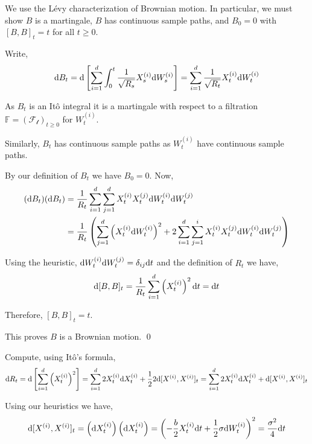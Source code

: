 \documentclass[10pt]{article}
\begin{document}
\begin{solution}[Solution]
We use the  L\'evy characterization of Brownian motion. In particular, we must show \( B \) is a martingale, \( B \) has continuous sample paths, and \( B_0 = 0 \) with \( [B,B]_t = t \) for all \( t\geq 0 \).

Write,
\begin{align*}
    \mathrm{d} B_t = \mathrm{d} \left[ \sum_{i=1}^{d} \int_{0}^{t} \dfrac{1}{\sqrt{R_s}}X_s^{(i)} \mathrm{d} W_s^{(i)} \right] = \sum_{i=1}^{d} \dfrac{1}{\sqrt{R_t}}X_t^{(i)} \mathrm{d} W_t^{(i)}
\end{align*}


As \( B_t \) is an It\^o integral it is a martingale with respect to a filtration \( \mathbb{F} = ( \mathcal{F_t} )_{t\geq 0} \) for \( W_t^{(i)} \).

Similarly, \( B_t \) has continuous sample paths as \( W_t^{(i)} \) have continuous sample paths.

By our definition of \( B_t \) we have \( B_0 = 0 \).
Now, 
\begin{align*}
    (\mathrm{d} B_t)(\mathrm{d} B_t) &= \dfrac{1}{R_t} \sum_{i=1}^{d}\sum_{j=1}^{d}X_t^{(i)}X_t^{(j)} \mathrm{d} W_t^{(i)} \mathrm{d} W_t^{(j)} \\
    &= \dfrac{1}{R_t} \left( \sum_{j=1}^{d} \left(X_t^{(i)} \mathrm{d} W_t^{(i)}\right)^2  + 2\sum_{i=1}^{d}\sum_{j=1}^{i} X_t^{(i)}X_t^{(j)} \mathrm{d} W_t^{(i)} \mathrm{d} W_t^{(j)} \right) 
\end{align*}

Using the heuristic, \( \mathrm{d} W_t^{(i)} \mathrm{d} W_t^{(j)} = \delta_{ij} \mathrm{d} t \) and the definition of \( R_t \) we have,
\begin{align*}
    \mathrm{d}[B,B]_t = \dfrac{1}{R_t} \sum_{i=1}^{d} \left( X_t^{(i)} \right)^2 \mathrm{d} t = \mathrm{d} t
\end{align*}

Therefore, \( [B,B]_t = t \).

This proves \( B \) is a Brownian motion. \qed

Compute, using It\^o's formula,
\begin{align*}
    \mathrm{d} R_t 
    = \mathrm{d} \left[ \sum_{i=1}^{d} \left( X_t^{(i)} \right)^2 \right]
    = \sum_{i=1}^{d} 2 X_t^{(i)} \mathrm{d} X_t^{(i)} + \frac{1}{2} 2 \mathrm{d} [X^{(i)},X^{(i)}] _t 
    = \sum_{i=1}^{d} 2X_t^{(i)} \mathrm{d} X_t^{(i)} + \mathrm{d}[X^{(i)},X^{(i)}]_t
\end{align*}

Using our heuristics we have,
\begin{align*}
    \mathrm{d}[X^{(i)},X^{(i)}]_t = \left( \mathrm{d} X_t^{(i)} \right) \left(\mathrm{d} X_t^{(i)} \right) 
    = \left( -\dfrac{b}{2} X_t^{(i)} \mathrm{d} t + \dfrac{1}{2}\sigma \mathrm{d} W_t^{(i)} \right)^2 
    = \dfrac{\sigma^2}{4} \mathrm{d} t
\end{align*}


\end{solution}
\end{document}
